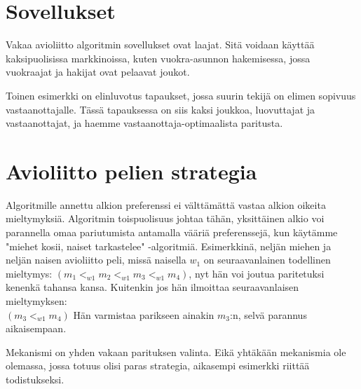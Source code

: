 \documentclass[finnish]{tktltiki2}
\theoremstyle{definition}
\theoremstyle{remark}
\begin{document}
\section{Sovellukset}
Vakaa avioliitto algoritmin sovellukset ovat laajat. Sitä voidaan käyttää kaksipuolisissa markkinoissa, kuten vuokra-asunnon hakemisessa, jossa vuokraajat ja hakijat ovat pelaavat joukot.

Toinen esimerkki on elinluvotus tapaukset, jossa suurin tekijä on elimen sopivuus vastaanottajalle. Tässä tapauksessa on siis kaksi joukkoa, luovuttajat ja vastaanottajat, ja haemme vastaanottaja-optimaalista paritusta.


\section{Avioliitto pelien strategia}
Algoritmille annettu alkion preferenssi ei välttämättä vastaa alkion oikeita mieltymyksiä. Algoritmin toispuolisuus johtaa tähän, yksittäinen alkio voi parannella omaa pariutumista antamalla vääriä preferenssejä, kun käytämme "miehet kosii, naiset tarkastelee" -algoritmiä.
Esimerkkinä, neljän miehen ja neljän naisen avioliitto peli, missä naisella $w_{1}$ on seuraavanlainen todellinen mieltymys:
$(m_{1} <_{w1} m_{2} <_{w1} m_{3} <_{w1} m_{4})$, nyt hän voi joutua paritetuksi kenenkä tahansa kansa. Kuitenkin jos hän ilmoittaa seuraavanlaisen mieltymyksen: \\
$(m_{3} <_{w1} m_{4})$ Hän varmistaa parikseen ainakin $m_{3}$:n, selvä parannus aikaisempaan.

Mekanismi on yhden vakaan parituksen valinta. Eikä yhtäkään mekanismia ole olemassa, jossa totuus olisi paras strategia, aikasempi esimerkki riittää todistukseksi.


%
%
 
%

%


\lastpage
\end{document}
